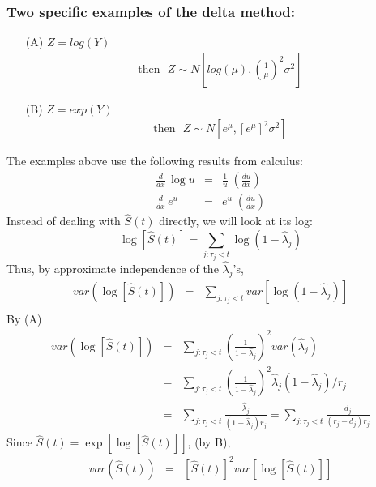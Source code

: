 \documentclass[11pt,slidesonly,semrot,portrait,palatino]{book}
\begin{document}
\subsubsection{Two specific examples of the delta method:}
\begin{itemize}
\item[(A)] $Z = log(Y)$
\begin{eqnarray*}
\mbox{then}~~~
Z \sim N\left[log(\mu),\left(\frac{1}{\mu}\right)^2 \sigma^2\right]
\end{eqnarray*}

\item[(B)] $Z = exp(Y)$
\begin{eqnarray*}
\mbox{then}~~~
Z \sim N\left[e^{\mu}, [e^{\mu}]^2 \sigma^2\right]
\end{eqnarray*}
\end{itemize}
The examples above use the following results from calculus:
\begin{eqnarray*}
\frac{d}{dx} \, \log u &=& \frac{1}{u} \; \left(\frac{du}{dx}\right)\\[2ex]
\frac{d}{dx} \, e^u &=& e^u  \; \left(\frac{du}{dx}\right)
\end{eqnarray*}
Instead of dealing with $\hat{S}(t)$ directly, we will look at its
log:\\
\[ \log[\hat{S}(t)] = \sum_{j: \tau_j < t} \log(1-\hat{\lambda}_j)  \]
Thus, by approximate independence of the $\hat{\lambda}_j$'s,
\begin{eqnarray*}
var(\log[\hat{S}(t)]) &=& \sum_{j: \tau_j < t} var[\log(1-\hat{\lambda}_j)]\\
\end{eqnarray*}
By (A)
\begin{eqnarray*}
var(\log[\hat{S}(t)]) & = & \sum_{j: \tau_j < t} \left( \frac{1}{1-\hat{\lambda}_j} \right)^2
 var(\hat{\lambda}_j) \\
 &=& \sum_{j: \tau_j < t} \left(\frac{1}{1-\hat{\lambda}_j}\right)^2
 \hat{\lambda}_j (1-\hat{\lambda}_j)/r_j \\
 &=& \sum_{j: \tau_j < t} \frac{\hat{\lambda}_j}{(1-\hat{\lambda}_j) r_j} = \sum_{j: \tau_j < t} \frac{d_j}{(r_j-d_j) r_j}
 \end{eqnarray*}
Since $\hat{S}(t) = \exp[\log[\hat{S}(t)]]$, (by B),
\begin{eqnarray*}
var(\hat{S}(t)) & = & [\hat{S}(t)]^2 var\left[\log[\hat{S}(t)]\right]
\end{eqnarray*}
\begin{center}
\end{center}
\end{document}
